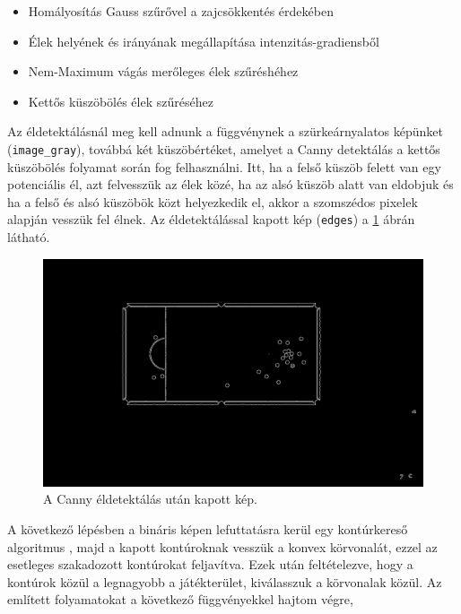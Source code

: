 \begin{itemize}
    \setlength\itemsep{-2pt}
    \item Homályosítás Gauss szűrővel \cite{shapiro2001} a zajcsökkentés érdekében
    \item Élek helyének és irányának megállapítása intenzitás-gradiensből
    \item Nem-Maximum vágás merőleges élek szűréshéhez
    \item Kettős küszöbölés élek szűréséhez
\end{itemize}

\par Az éldetektálásnál meg kell adnunk a függvénynek a szürkeárnyalatos képünket (\lstinline{image_gray}), továbbá két küszöbértéket, amelyet a Canny detektálás a kettős küszöbölés folyamat során fog felhasználni. Itt, ha a felső küszöb felett van egy potenciális él, azt felvesszük az élek közé, ha az alsó küszöb alatt van eldobjuk és ha a felső és alsó küszöbök közt helyezkedik el, akkor a szomszédos pixelek alapján vesszük fel élnek. Az éldetektálással kapott kép (\lstinline{edges}) a \ref{fig:bemeneti_kep_edge} ábrán látható.

\begin{figure}[!ht]
    \centering
    \includegraphics[width=150mm, keepaspectratio]{figures/input_screen_edge.png}
    \caption{A Canny éldetektálás után kapott kép.}
    \label{fig:bemeneti_kep_edge}
\end{figure}

\par A következő lépésben a bináris képen lefuttatásra kerül egy kontúrkereső algoritmus \cite{SUZUKI198532}, majd a kapott kontúroknak vesszük a konvex körvonalát, ezzel az esetleges szakadozott kontúrokat feljavítva. Ezek után feltételezve, hogy a kontúrok közül a legnagyobb a játékterület, kiválasszuk a körvonalak közül.
\newline Az említett folyamatokat a következő függvényekkel hajtom végre,

